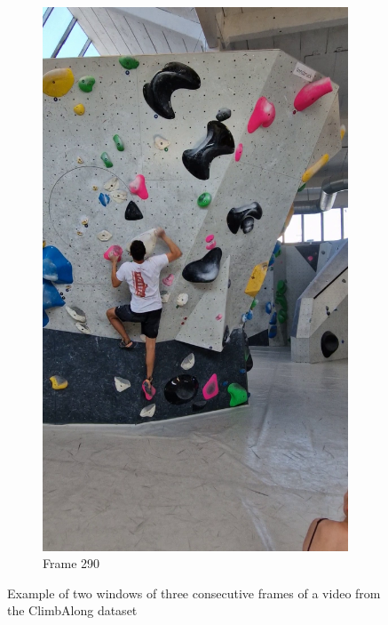 \documentclass[./main.tex]{subfiles}
\begin{document}
\begin{figure}[htbp]
\begin{subfigure}{0.3\textwidth}
        \includegraphics[width=\textwidth]{entities/CA_290.png}
        \caption{Frame 290}
    \end{subfigure}

    \caption{Example of two windows of three consecutive frames of a video from the ClimbAlong dataset}
    \label{fig:CA_dataset}
\end{figure}
\end{document}
